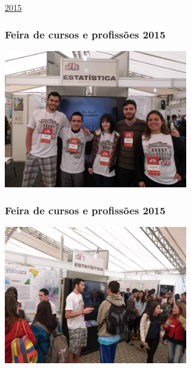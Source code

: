 \documentclass[10pt,
  aspectratio=169,
  serif,
  mathserif,
  professionalfont,
  compress,
  handout,
  ]{beamer}\usepackage[]{graphicx}\usepackage[]{color}
\begin{document}
\begin{frame}[c, allowframebreaks]

\begin{center}

  {\huge \href{https://lineu96.github.io/st/}{2015}}
  
\end{center}

\end{frame}


\begin{frame}

\frametitle{Feira de cursos e profissões 2015}

\begin{center}
  \includegraphics[width=8cm]{img/feira1.jpg}
\end{center}

\end{frame}


\begin{frame}

\frametitle{Feira de cursos e profissões 2015}

\begin{center}
  \includegraphics[width=8cm]{img/feira2.jpg}
\end{center}

\end{frame}
\end{document}
